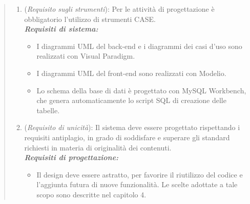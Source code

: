 \begin{quote}
\begin{enumerate}[label=\textit{RO\arabic*}]
  \item (\textit{Requisito sugli strumenti}): Per le attività di progettazione è obbligatorio l'utilizzo di strumenti CASE. \\
  \textbf{\textit{Requisiti di sistema:}} 
    \begin{itemize}
        \item I diagrammi UML del back-end e i diagrammi dei casi d'uso sono realizzati con Visual Paradigm.
  \item I diagrammi UML del front-end sono realizzati con Modelio.
  \item Lo schema della base di dati è progettato con MySQL Workbench, che genera automaticamente lo script SQL di creazione delle tabelle.
    \end{itemize}
  
  \item (\textit{Requisito di unicità}): Il sistema deve essere progettato rispettando i requisiti antiplagio, in grado di soddisfare e superare gli standard richiesti in materia di originalità dei contenuti. \\
  \textbf{\textit{Requisiti di progettazione:}} 
    \begin{itemize}
        \item Il design deve essere astratto, per favorire il riutilizzo del codice e l'aggiunta futura di nuove funzionalità. Le scelte adottate a tale scopo sono descritte nel capitolo 4.
    \end{itemize}
\end{enumerate} 
\end{quote}